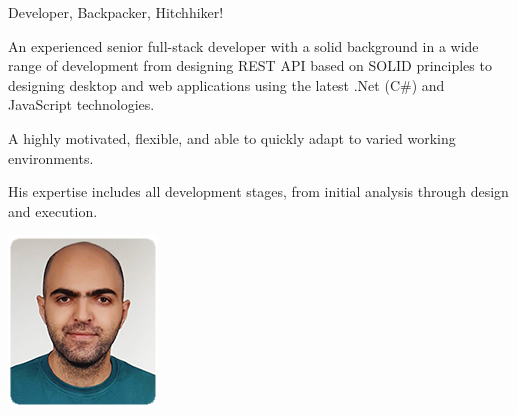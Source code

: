 
\begin{cvabout}







\noindent\begin{minipage}{0.7\textwidth}%
Developer, Backpacker, Hitchhiker! 

\begin{flushleft}

\end{flushleft}

{An experienced senior full-stack developer with a solid background in a wide range of development from designing  REST  API based on  SOLID principles to designing desktop and web applications using the latest .Net (C\#) and JavaScript technologies.

A highly motivated, flexible, and able to quickly adapt to varied working environments.

His expertise includes all development stages, from initial analysis through design and execution.}

\end{minipage}%
\hfill%
\begin{minipage}{0.2\textwidth}\RaggedRight
\includegraphics[width=\linewidth]{cv-sections/profile.png}
\end{minipage}

\end{cvabout}





